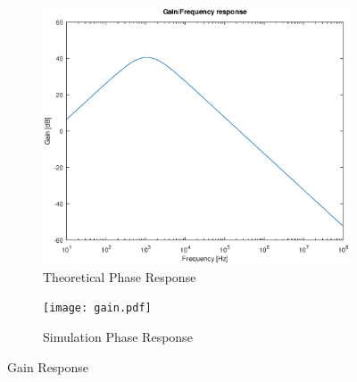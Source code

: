 \begin{figure}[h]
\centering
\begin{subfigure}{.5\textwidth}
    \centering
    \vspace{2.8 cm}
    \includegraphics[scale=0.4]{gain_response.eps}
    \caption{Theoretical Phase Response}
\end{subfigure}%
\begin{subfigure}{.5\textwidth}
    \centering
    \texttt{[image: gain.pdf]}
    \caption{Simulation Phase Response}
\end{subfigure}
\caption{Gain Response}
\label{fig:comp2}
\end{figure}

